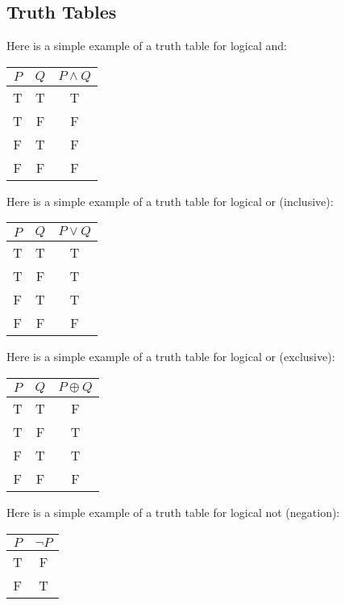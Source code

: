 \documentclass{report}
\begin{document}
    \subsection{Truth Tables}
    \bigbreak \noindent 
        Here is a simple example of a truth table for logical and:
    \bigbreak \noindent 
    \begin{center}
        \begin{tabular}{|c|c|c|}
            \hline
            $P$ & $Q$ & $P \land Q$ \\
            \hline
            T & T & T \\
            T & F & F \\
            F & T & F \\
            F & F & F \\
            \hline
        \end{tabular}
    \end{center}
    \bigbreak \noindent 
    Here is a simple example of a truth table for logical or (inclusive):
    \bigbreak \noindent 
    \begin{center}
        \begin{tabular}{|c|c|c|}
            \hline
            $P$ & $Q$ & $P \lor Q$ \\
            \hline
            T & T & T \\
            T & F & T \\
            F & T & T \\
            F & F & F \\
            \hline
        \end{tabular}
    \end{center}
    \bigbreak \noindent 
    Here is a simple example of a truth table for logical or (exclusive):
    \bigbreak \noindent 
    \begin{center}
        \begin{tabular}{|c|c|c|}
            \hline
            $P$ & $Q$ & $P \oplus Q$ \\
            \hline
            T & T & F \\
            T & F & T \\
            F & T & T \\
            F & F & F \\
            \hline
        \end{tabular}
    \end{center}
    \bigbreak \noindent 
    Here is a simple example of a truth table for logical not (negation):
    \begin{center}
        \begin{tabular}{|c|c|}
            \hline
            $P$ & $\lnot P$ \\
            \hline
            T & F \\
            F & T \\
            \hline
        \end{tabular}
    \end{center}
\end{document}
